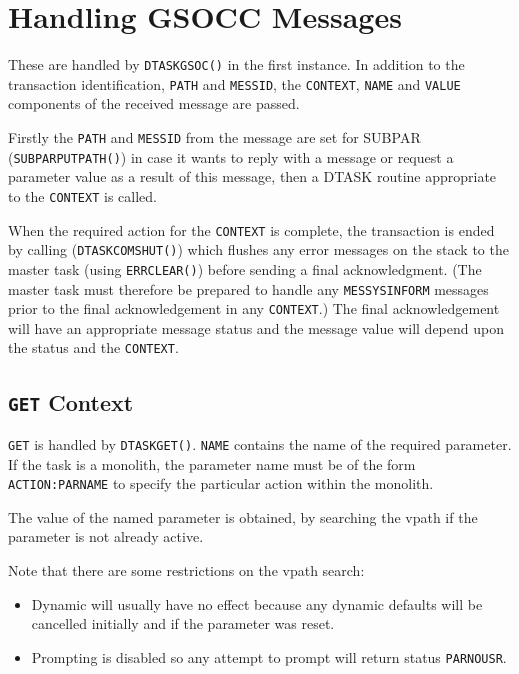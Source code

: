 \documentclass[twoside,11pt]{article}
\newcommand{\xref}[3]{#1}
\renewcommand{\_}{\texttt{\symbol{95}}}
\begin{document}
\section{\label{handling_gsocc_messages}Handling GSOCC Messages}
These are handled by \texttt{DTASK\_GSOC()} in the first instance. In addition
to the transaction identification, \texttt{PATH} and \texttt{MESSID}, the
\texttt{CONTEXT}, \texttt{NAME} and \texttt{VALUE} components of the received
message are passed.

Firstly the \texttt{PATH} and \texttt{MESSID} from the message are set for
SUBPAR (\texttt{SUBPAR\_PUTPATH()}) in case it wants to reply with a message or
request a parameter value as a result of this message, then a DTASK routine
appropriate to the \texttt{CONTEXT} is called.

When the required action for the \texttt{CONTEXT} is complete, the transaction
is ended by calling (\texttt{DTASK\_COMSHUT()}) which flushes any error
messages on the stack to the master task (using
\xref{\texttt{ERR\_CLEAR()}}{ssn4}{ERR_CLEAR})
before sending a final acknowledgment.
(The master task must therefore be prepared to handle any
\texttt{MESSYS\_\_INFORM} messages prior to the final acknowledgement in any
\texttt{CONTEXT}.)
The final acknowledgement will have an appropriate message status and the
message value will depend upon the status and the \texttt{CONTEXT}.

\subsection{\label{get_context}\texttt{GET} Context}
\texttt{GET} is handled by \texttt{DTASK\_GET()}.
\texttt{NAME} contains the name of the required parameter. If the task is a
\xref{monolith}{sun144}{introduction}, the parameter name must be of the form
\texttt{ACTION:PARNAME} to specify the particular action within the monolith.

The value of the named parameter is obtained, by searching the
\xref{vpath}{sun115}{the_vpath_field}
if the parameter is not already active.

Note that there are some restrictions on the vpath search:
\begin{itemize}
\item Dynamic will usually have no effect because any
dynamic defaults will be cancelled initially and if the parameter was reset.
\item Prompting is disabled so any attempt to prompt will return status
\texttt{PAR\_\_NOUSR}.
\end{itemize}
\end{document}
